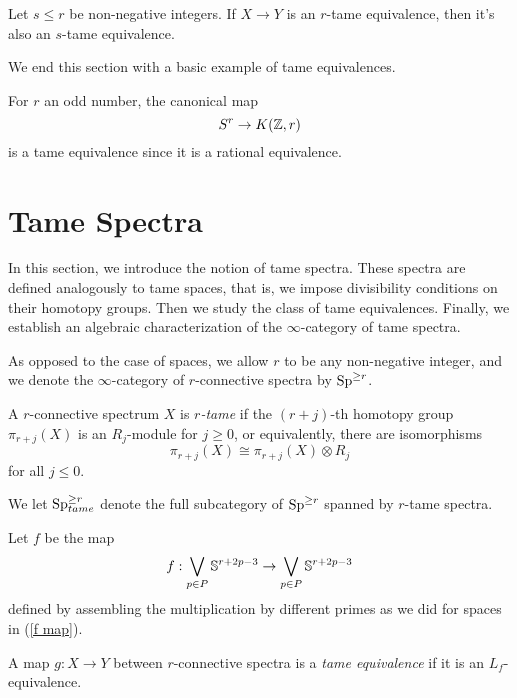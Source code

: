 \begin{remark}
	Let $s\leq r$ be non-negative integers.
	If $X\to Y$ is an $r$-tame equivalence, then it's also an $s$-tame equivalence.
\end{remark}

We end this section with a basic example of tame equivalences.
\begin{example}
\label{odd sphere is tame equivalent to EM-space}
For $r$ an odd number,
the canonical map 
$$
S^r \to K({\mathbb{Z}}, r)
$$
is a tame equivalence since it is a rational equivalence.
\end{example}

\section{Tame Spectra}
\label{Section: Tame spectra}

In this section, we introduce the notion of tame spectra.
These spectra are defined analogously to tame spaces, that is, we impose divisibility conditions on their homotopy groups.
Then we study the class of tame equivalences.
Finally, we establish an algebraic characterization of the $\infty$-category of tame spectra.

As opposed to the case of spaces, we allow $r$ to be any non-negative integer, and we denote the $\infty$-category of $r$-connective spectra by $\operatorname{Sp}^{\geq r}$.

\begin{definition}
	A $r$-connective spectrum $X$ is \emph{$r$-tame} if the $(r+j)$-th homotopy group $\pi_{r+j}(X)$ is an $R_j$-module for $j\geq 0$, or equivalently, there are isomorphisms
	\[
	\pi_{r+j}(X)\cong \pi_{r+j}(X)\otimes R_{j}
	\]
	for all $j\leq 0$.
\end{definition}

\begin{notation}
We let $\operatorname{Sp}^{\geq r}_{tame}$ denote the full subcategory of $\operatorname{Sp}^{\geq r}$ spanned by $r$-tame spectra.
\end{notation}


Let $f$ be the map 
\begin{equation}
\label{f for spectra}
	f: \bigvee_{p\in P}{\mathbb{S}}^{r+2p-3} \to \bigvee_{p\in P}{\mathbb{S}}^{r+2p-3}
\end{equation}
defined by assembling the multiplication by different primes as we did for spaces in (\ref{f map}).
\begin{definition}
    A map $g:X \to Y$ between $r$-connective spectra is a \emph{tame equivalence} if it is an $L_f$-equivalence.
\end{definition}

